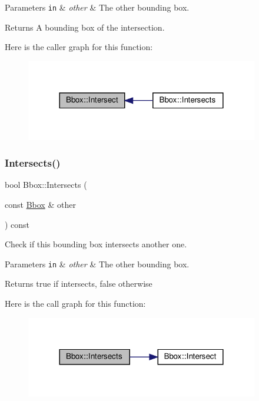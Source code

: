 \begin{DoxyParams}[1]{Parameters}
\mbox{\tt in}  & {\em other} & The other bounding box.\\
\hline
\end{DoxyParams}
\begin{DoxyReturn}{Returns}
A bounding box of the intersection. 
\end{DoxyReturn}
Here is the caller graph for this function\+:\nopagebreak
\begin{figure}[H]
\begin{center}
\leavevmode
\includegraphics[width=288pt]{classBbox_a0b8e77b794311da86b4c09ed2919af0f_icgraph}
\end{center}
\end{figure}
\mbox{\label{classBbox_a6ac93cd8475f5ef8eb4007d8c206b39d}} 
\subsubsection{\texorpdfstring{Intersects()}{Intersects()}}
{\footnotesize\ttfamily bool Bbox\+::\+Intersects (\begin{DoxyParamCaption}\item[{const \hyperlink{classBbox}{Bbox} \&}]{other }\end{DoxyParamCaption}) const}



Check if this bounding box intersects another one. 


\begin{DoxyParams}[1]{Parameters}
\mbox{\tt in}  & {\em other} & The other bounding box.\\
\hline
\end{DoxyParams}
\begin{DoxyReturn}{Returns}
true if intersects, false otherwise 
\end{DoxyReturn}
Here is the call graph for this function\+:\nopagebreak
\begin{figure}[H]
\begin{center}
\leavevmode
\includegraphics[width=288pt]{classBbox_a6ac93cd8475f5ef8eb4007d8c206b39d_cgraph}
\end{center}
\end{figure}
\mbox{\label{classBbox_ac590fb2bfb031f1ac4238455caf357d7}} 
